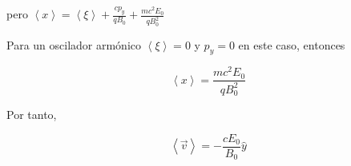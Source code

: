 \begin{solution}
pero $\left\langle x\right\rangle =\left\langle \xi\right\rangle +\frac{cp_{y}}{qB_{0}}+\frac{mc^{2}E_{0}}{qB_{0}^{2}}$

Para un oscilador armónico $\left\langle \xi\right\rangle =0$ y $p_{y}=0$
en este caso, entonces

\[
\left\langle x\right\rangle =\frac{mc^{2}E_{0}}{qB_{0}^{2}}
\]

Por tanto,

\[
\left\langle \vec{v}\right\rangle =-\frac{cE_{0}}{B_{0}}\hat{y}
\]

\end{solution}
